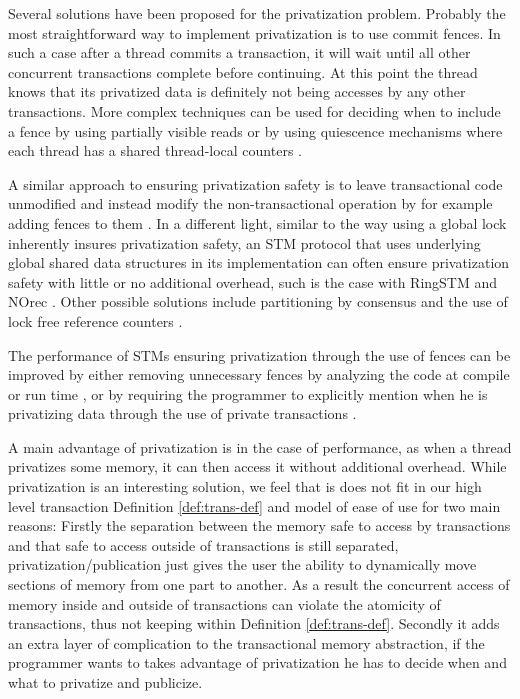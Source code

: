Several solutions have been proposed for the privatization problem.
Probably the most straightforward way to implement privatization
is to use commit fences.
In such a case after a thread commits a transaction, it will wait
until all other concurrent transactions complete before continuing.
At this point the thread knows that its privatized data is definitely
not being accesses by any other transactions.
More complex techniques can be used for deciding when to include
a fence by using partially visible reads \cite{MSS08} or by using quiescence mechanisms
where each thread has a shared thread-local counters \cite{MBS08}.

A similar approach to ensuring privatization safety is to leave transactional
code unmodified and instead modify the non-transactional operation by
for example adding fences to them \cite{shpeis07}.
In a different light, similar to the way using a global lock inherently insures privatization
safety, an STM protocol that uses underlying global shared data structures in its implementation can often
ensure privatization safety with little or no additional overhead, such is the case
with RingSTM \cite{SMP08} and NOrec \cite{DSS10}.
Other possible solutions include partitioning by consensus 
\cite{scott07} and the use of lock free reference   counters  \cite{afek10}.

The performance of STMs ensuring privatization through the use of fences
can be improved by either removing unnecessary fences by analyzing the code
at compile or run time \cite{SMSA08}, or by requiring the programmer to explicitly
mention when he is privatizing data through the use of private transactions \cite{dice10}.



A main advantage of privatization is in the case of performance, as when
a thread privatizes some memory, it can then access it without additional overhead.
While privatization is an interesting solution, we feel that is does not
fit in our high level transaction Definition \ref{def:trans-def} and 
model of ease of use for two main reasons:
Firstly the separation between the memory safe to access by transactions
and that safe to access outside of transactions is still separated, privatization/publication
just gives the user the ability to dynamically move sections of memory
from one part to another.
As a result the concurrent access of memory inside and outside of transactions
can violate the atomicity of transactions, thus not keeping within Definition \ref{def:trans-def}.
Secondly it adds an extra layer of complication to the transactional memory
abstraction, if the programmer wants to takes advantage of privatization he
has to decide when and what to privatize and publicize.



